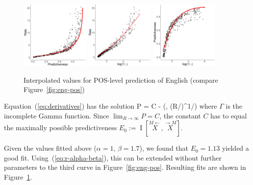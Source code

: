 \documentclass[entropy,article,submit,moreauthors,pdftex,10pt,a4paper]{Definitions/mdpi}
\newcommand{\finitefuture}{\stackrel{\rightarrow \scriptscriptstyle{M}}{X}}
\newcommand{\finitepast}{\stackrel{\scriptscriptstyle{M}\leftarrow}{X}}%
\let\oldequation\equation
\let\oldendequation\endequation
\renewenvironment{equation}
  {\linenomathNonumbers\oldequation}
  {\oldendequation\endlinenomath}
\begin{document}
\begin{figure}
\includegraphics[width=0.3\textwidth]{code/figures/english-info-fitted.pdf}
\includegraphics[width=0.3\textwidth]{code/figures/english-logbeta-mem-fitted.pdf}
	\includegraphics[width=0.3\textwidth]{code/figures/english-nlogbeta-ee-fitted.pdf}
	\caption{Interpolated values for POS-level prediction of English (compare Figure~\ref{fig:eng-pos}) }\label{fig:eng-pos-fitted}
\end{figure}


Equation~(\ref{eq:derivatives}) has the solution
\begin{equation}\label{eq:sol}
	P = C - \alpha\beta \cdot \Gamma\left(\beta, (R/\alpha)^{1/\beta}\right)
\end{equation}
where $\Gamma$ is the incomplete Gamma function.
Since $\lim_{R \rightarrow \infty} P = C$, the constant $C$ has to equal the maximally possible predictiveness $E_0 := \operatorname{I}[\finitepast, \finitefuture]$.

Given the values fitted above ($\alpha=1$, $\beta=1.7$), we found that $E_0 = 1.13$ yielded a good fit.
Using~(\ref{eq:r-alpha-beta}), this can be extended without further parameters to the third curve in Figure~\ref{fig:eng-pos}.
Resulting fits are shown in Figure~\ref{fig:eng-pos-fitted}.
\end{document}
